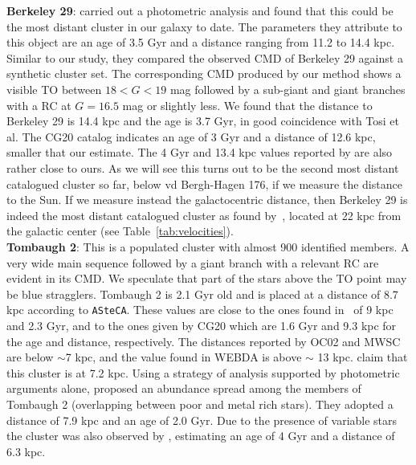 \documentclass[referee]{aa}
\begin{document}
\begin{appendix}
  \noindent \textbf{Berkeley 29}: \cite{Tosi_2004} carried out a photometric analysis
  and found that this could be the most distant cluster in our galaxy to date.
  The parameters they attribute to this object are an age of 3.5 Gyr and a
  distance ranging from 11.2 to 14.4 kpc.
  Similar to our study, they compared the observed CMD of Berkeley 29 against a
  synthetic cluster set. The corresponding CMD produced by our method
  shows a visible TO between $18<G<19$ mag followed by a sub-giant and giant
  branches with a RC at $G=16.5$ mag or slightly less. We found that the
  distance to Berkeley 29 is 14.4 kpc and the age is 3.7 Gyr, in good
  coincidence with Tosi et al. The CG20 catalog indicates an age of 3 Gyr and a
  distance of 12.6 kpc, smaller that our estimate. The 4 Gyr and 13.4
  kpc values reported by \cite{Frinchaboy_2006} are also rather close to ours.
  As we will see this turns out to be the second most
  distant catalogued cluster so far, below vd Bergh-Hagen 176, if we measure
  the distance to the Sun. If we measure instead the galactocentric distance,
  then Berkeley 29 is indeed the most distant catalogued cluster as found
  by~\cite{Tosi_2004}, located at 22 kpc from the galactic center (see
  Table~\ref{tab:velocities}).\\

  \noindent \textbf{Tombaugh 2}: This is a populated cluster with almost 900 identified
  members. A very wide main sequence followed by a giant branch with a relevant
  RC are evident in its CMD. We speculate that part of the stars
  above the TO point may be blue stragglers. Tombaugh 2 is 2.1 Gyr old and is
  placed at a distance of 8.7 kpc according to \texttt{ASteCA}. These values are
  close to the ones found in~\cite{Dias_2021} of 9 kpc and 2.3 Gyr, and
  to the ones given by CG20 which are 1.6 Gyr and 9.3 kpc for the age
  and distance, respectively. The distances reported by OC02 and MWSC are below
  $\sim$7 kpc, and the value found in WEBDA is above $\sim$ 13 kpc.
  \cite{Villanova_2010} claim that this cluster is at 7.2 kpc.
  Using a strategy of analysis supported by photometric arguments alone, 
  \cite{Frinchaboy_2008} proposed an abundance spread among the members of
  Tombaugh 2 (overlapping between poor and metal rich stars). They adopted a
  distance of 7.9 kpc and an age of 2.0 Gyr.
  Due to the presence of variable stars the cluster was also observed by
  \cite{Kubiak_1992}, estimating an age of 4 Gyr and a distance of 6.3 kpc.\\


\end{appendix}
\end{document}
